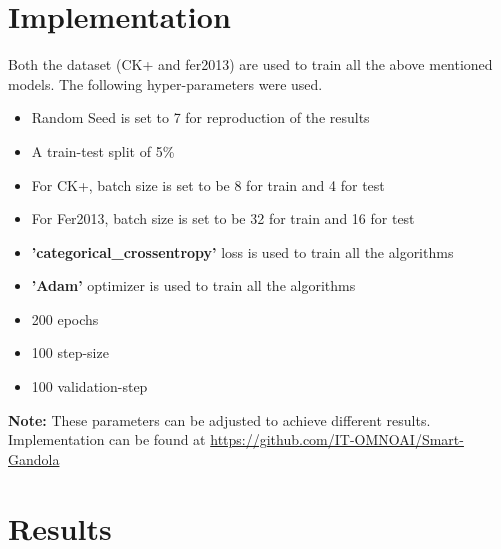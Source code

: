 \documentclass[11pt]{article}
\begin{document}
	\section{Implementation}
	Both the dataset (CK+ and fer2013) are used to train all the above mentioned models. The following hyper-parameters were used.
	\begin{itemize}
		\item Random Seed is set to 7 for reproduction of the results
		\item A train-test split of 5\%
		\item For CK+, batch size is set to be 8 for train and 4 for test
		\item For Fer2013, batch size is set to be 32 for train and 16 for test
		\item \textbf{'categorical\_crossentropy'} loss is used to train all the algorithms
		\item \textbf{'Adam'} optimizer is used to train all the algorithms
		\item 200 epochs
		\item 100 step-size
		\item 100 validation-step 
		
	\end{itemize} 
	\textbf{Note: }These parameters can be adjusted to achieve different results.
	\newline
	\newline
	Implementation can be found at
	\newline
	\url{https://github.com/IT-OMNOAI/Smart-Gandola}

	\newpage

	\section{Results}
\end{document}
